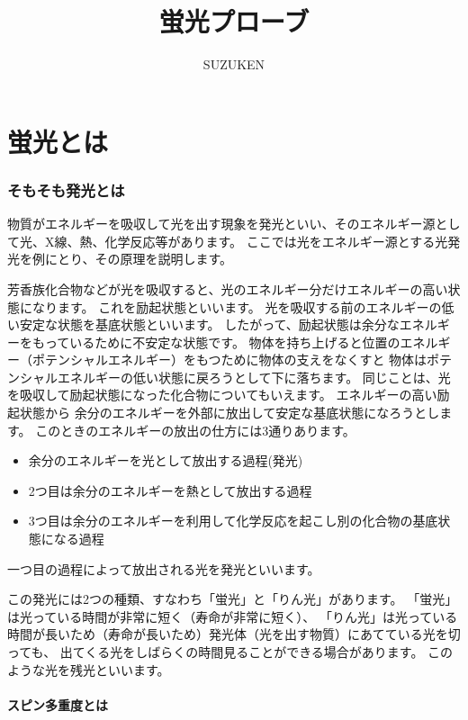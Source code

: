 \documentclass[a4paper,papersize,dvipdfmx]{jsarticle}
\begin{document}
\title{蛍光プローブ}
\author{SUZUKEN}
\date{}
\maketitle



\part{蛍光とは}

\section{そもそも発光とは}

物質がエネルギーを吸収して光を出す現象を発光といい、そのエネルギー源として光、X線、熱、化学反応等があります。
ここでは光をエネルギー源とする光発光を例にとり、その原理を説明します。

芳香族化合物などが光を吸収すると、光のエネルギー分だけエネルギーの高い状態になります。
これを励起状態といいます。
光を吸収する前のエネルギーの低い安定な状態を基底状態といいます。
したがって、励起状態は余分なエネルギーをもっているために不安定な状態です。
物体を持ち上げると位置のエネルギー（ポテンシャルエネルギー）をもつために物体の支えをなくすと
物体はポテンシャルエネルギーの低い状態に戻ろうとして下に落ちます。
同じことは、光を吸収して励起状態になった化合物についてもいえます。
エネルギーの高い励起状態から 余分のエネルギーを外部に放出して安定な基底状態になろうとします。
このときのエネルギーの放出の仕方には3通りあります。
\begin{itemize}
\item 余分のエネルギーを光として放出する過程(発光)
\item 2つ目は余分のエネルギーを熱として放出する過程
\item 3つ目は余分のエネルギーを利用して化学反応を起こし別の化合物の基底状態になる過程
\end{itemize}
一つ目の過程によって放出される光を発光といいます。

この発光には2つの種類、すなわち「蛍光」と「りん光」があります。
「蛍光」は光っている時間が非常に短く（寿命が非常に短く）、
「りん光」は光っている時間が長いため（寿命が長いため）発光体（光を出す物質）にあてている光を切っても、
出てくる光をしばらくの時間見ることができる場合があります。
このような光を残光といいます。

\subsection{スピン多重度とは}
\end{document}

